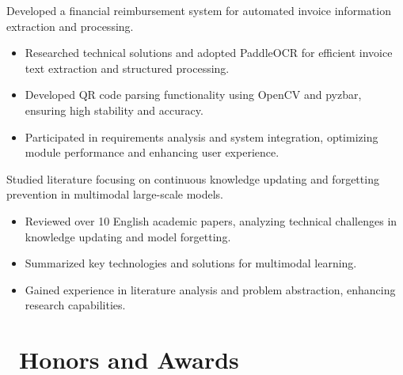 \documentclass{../../styles/resume}
\begin{document}
\begin{onehalfspacing}
Developed a financial reimbursement system for automated invoice information extraction and processing.
\begin{itemize}
  \item Researched technical solutions and adopted PaddleOCR for efficient invoice text extraction and structured processing.
  \item Developed QR code parsing functionality using OpenCV and pyzbar, ensuring high stability and accuracy.
  \item Participated in requirements analysis and system integration, optimizing module performance and enhancing user experience.
\end{itemize}
\end{onehalfspacing}

\begin{onehalfspacing}
Studied literature focusing on continuous knowledge updating and forgetting prevention in multimodal large-scale models.
\begin{itemize}
  \item Reviewed over 10 English academic papers, analyzing technical challenges in knowledge updating and model forgetting.
  \item Summarized key technologies and solutions for multimodal learning.
  \item Gained experience in literature analysis and problem abstraction, enhancing research capabilities.
\end{itemize}
\end{onehalfspacing}

\section{\faHeartO\ Honors and Awards}
\end{document}
